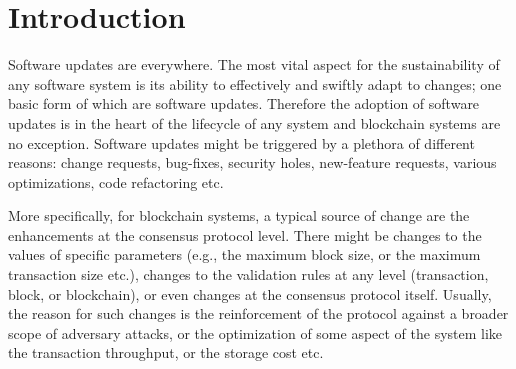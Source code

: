 \section{Introduction}
Software updates are everywhere. The most vital aspect for the sustainability of any software system is its ability to effectively and swiftly adapt to changes; one basic form of which are software updates. Therefore the adoption of software updates is in the heart of the lifecycle of any system and blockchain systems are no exception. Software updates might be triggered by a plethora of different reasons: change requests, bug-fixes, security holes, new-feature requests, various optimizations, code refactoring etc.


More specifically, for blockchain systems, a typical source of change are the enhancements at the consensus protocol level. There might be changes to the values of specific parameters (e.g., the maximum block size, or the maximum transaction size etc.), changes to the validation rules at any level (transaction, block, or blockchain), or even changes at the consensus protocol itself. Usually, the reason for such changes is the reinforcement of the protocol against a broader scope of adversary attacks, or the optimization of some aspect of the system like the transaction throughput, or the storage cost etc.


